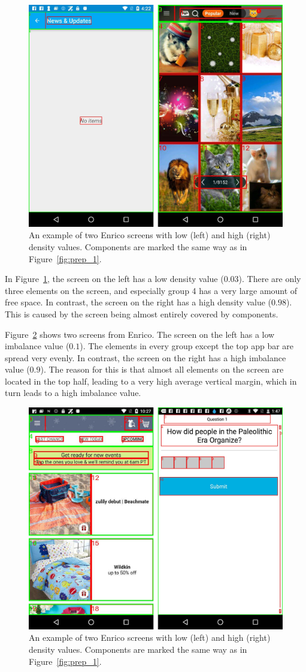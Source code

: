 \documentclass[11pt,titlepage,oneside,openany]{book}
\begin{document}
\begin{figure}[H]
	\centering
	\includegraphics[width=.7\textwidth]{figures/density.png}
	\caption{An example of two Enrico screens with low (left) and high (right) density values. Components are marked the same way as in Figure~\ref{fig:prep_1}.}
	\label{fig:dens_ex}
\end{figure}

In Figure~\ref{fig:dens_ex}, the screen on the left has a low density value ($0.03$). There are only three elements on the screen, and especially group 4 has a very large amount of free space. In contrast, the screen on the right has a high density value ($0.98$). This is caused by the screen being almost entirely covered by components.

Figure~\ref{fig:imb_ex} shows two screens from Enrico. The screen on the left has a low imbalance value ($0.1$). The elements in every group except the top app bar are spread very evenly. In contrast, the screen on the right has a high imbalance value ($0.9$). The reason for this is that almost all elements on the screen are located in the top half, leading to a very high average vertical margin, which in turn leads to a high imbalance value.

\begin{figure}[H]
	\centering
	\includegraphics[width=.7\textwidth]{figures/imbalance.png}
	\caption{An example of two Enrico screens with low (left) and high (right) density values. Components are marked the same way as in Figure~\ref{fig:prep_1}.}
	\label{fig:imb_ex}
\end{figure}
\end{document}

